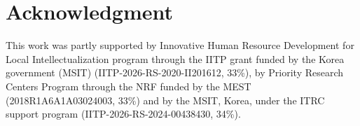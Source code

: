 \documentclass[10pt, conference]{IEEEtran}
\begin{document}
\section*{Acknowledgment}
This work was partly supported by Innovative Human Resource Development for Local Intellectualization program through the IITP grant funded by the Korea government (MSIT) (IITP-2026-RS-2020-II201612, 33\%), by Priority Research Centers Program through the NRF funded by the MEST (2018R1A6A1A03024003, 33\%) and by the MSIT, Korea, under the ITRC support program (IITP-2026-RS-2024-00438430, 34\%).



\end{document}
